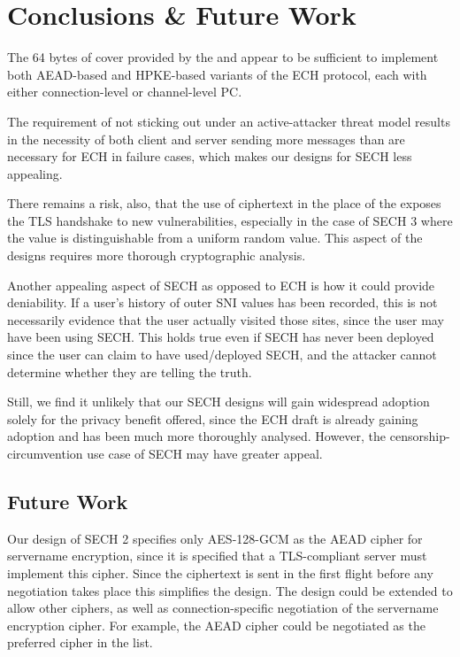 \chapter{Conclusions \& Future Work}
\label{chap:Conclusions}
The 64 bytes of cover provided by
the  and 
appear to be sufficient to implement both \ac{AEAD}-based
and \ac{HPKE}-based variants of the \ac{ECH} protocol,
each with either connection-level or channel-level \ac{PC}.

The requirement of not sticking out under an active-attacker threat model results
in the necessity of both client and server sending more messages than are necessary for \ac{ECH} in failure cases,
which makes our designs for \ac{SECH} less appealing.

There remains a risk, also, that the use of ciphertext in
the place of the 
exposes the \ac{TLS} handshake to new vulnerabilities,
especially in the case of \ac{SECH} 3 where the 
value is distinguishable from a uniform random value.
This aspect of the designs requires more thorough cryptographic analysis.

Another appealing aspect of \ac{SECH} as opposed to \ac{ECH}
is how it could provide deniability.
If a user's history of outer \ac{SNI} values has been recorded,
this is not necessarily evidence that the user actually visited
those sites, since the user may have been using \ac{SECH}.
This holds true even if \ac{SECH} has never been deployed since
the user can claim to have used/deployed \ac{SECH},
and the attacker cannot determine whether they are telling the truth.

Still, we find it unlikely that our \ac{SECH} designs will gain
widespread adoption solely for the privacy benefit offered,
since the \ac{ECH} draft is already gaining adoption and has
been much more thoroughly analysed.
However, the censorship-circumvention use case of \ac{SECH} may have greater appeal.

\section{Future Work}

Our design of \ac{SECH} 2 specifies only \ac{AES}-128-\ac{GCM} as the \ac{AEAD} cipher for servername encryption, since
it is specified that a \ac{TLS}-compliant
server must implement this cipher.
Since the ciphertext is sent in the first flight before any negotiation takes place this simplifies the design.
The design could be extended to allow other ciphers,
as well as connection-specific negotiation of the servername encryption cipher.
For example, the \ac{AEAD} cipher could be negotiated as the preferred cipher in the 
 list.

